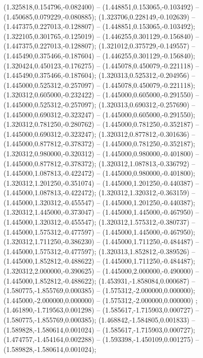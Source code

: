  (1.325818,0.154796,-0.082400) -- (1.448851,0.153065,-0.103492) -- (1.450685,0.079229,-0.080885);
 (1.323706,0.228149,-0.102639) -- (1.447375,0.227013,-0.128807) -- (1.448851,0.153065,-0.103492);
 (1.322105,0.301765,-0.125019) -- (1.446255,0.301129,-0.156840) -- (1.447375,0.227013,-0.128807);
 (1.321012,0.375729,-0.149557) -- (1.445490,0.375466,-0.187604) -- (1.446255,0.301129,-0.156840);
 (1.320424,0.450123,-0.176275) -- (1.445078,0.450079,-0.221118) -- (1.445490,0.375466,-0.187604);
 (1.320313,0.525312,-0.204956) -- (1.445000,0.525312,-0.257097) -- (1.445078,0.450079,-0.221118);
 (1.320312,0.605000,-0.232422) -- (1.445000,0.605000,-0.291550) -- (1.445000,0.525312,-0.257097);
 (1.320313,0.690312,-0.257690) -- (1.445000,0.690312,-0.323247) -- (1.445000,0.605000,-0.291550);
 (1.320312,0.781250,-0.280762) -- (1.445000,0.781250,-0.352187) -- (1.445000,0.690312,-0.323247);
 (1.320312,0.877812,-0.301636) -- (1.445000,0.877812,-0.378372) -- (1.445000,0.781250,-0.352187);
 (1.320312,0.980000,-0.320312) -- (1.445000,0.980000,-0.401800) -- (1.445000,0.877812,-0.378372);
 (1.320312,1.087813,-0.336792) -- (1.445000,1.087813,-0.422472) -- (1.445000,0.980000,-0.401800);
 (1.320312,1.201250,-0.351074) -- (1.445000,1.201250,-0.440387) -- (1.445000,1.087813,-0.422472);
 (1.320312,1.320312,-0.363159) -- (1.445000,1.320312,-0.455547) -- (1.445000,1.201250,-0.440387);
 (1.320312,1.445000,-0.373047) -- (1.445000,1.445000,-0.467950) -- (1.445000,1.320312,-0.455547);
 (1.320312,1.575312,-0.380737) -- (1.445000,1.575312,-0.477597) -- (1.445000,1.445000,-0.467950);
 (1.320312,1.711250,-0.386230) -- (1.445000,1.711250,-0.484487) -- (1.445000,1.575312,-0.477597);
 (1.320313,1.852812,-0.389526) -- (1.445000,1.852812,-0.488622) -- (1.445000,1.711250,-0.484487);
 (1.320312,2.000000,-0.390625) -- (1.445000,2.000000,-0.490000) -- (1.445000,1.852812,-0.488622);
 (1.453931,-1.858084,0.000687) -- (1.580775,-1.855769,0.000385) -- (1.575312,-2.000000,0.000000);
 (1.445000,-2.000000,0.000000) -- (1.575312,-2.000000,0.000000) ;
 (1.461890,-1.719563,0.001298) -- (1.585617,-1.715903,0.000727) -- (1.580775,-1.855769,0.000385);
 (1.468842,-1.584805,0.001833) -- (1.589828,-1.580614,0.001024) -- (1.585617,-1.715903,0.000727);
 (1.474757,-1.454164,0.002288) -- (1.593398,-1.450109,0.001275) -- (1.589828,-1.580614,0.001024);
